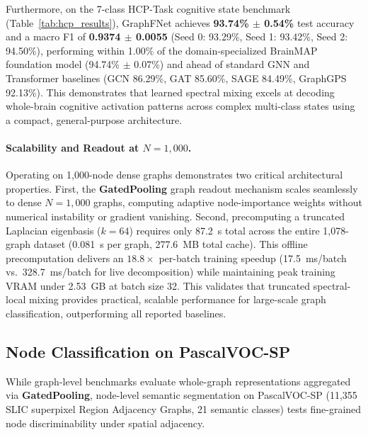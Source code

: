 \documentclass[10pt]{article}
\begin{document}
Furthermore, on the 7-class HCP-Task cognitive state benchmark (Table~\ref{tab:hcp_results}), GraphFNet achieves \textbf{93.74\% $\pm$ 0.54\%} test accuracy and a macro F1 of \textbf{0.9374 $\pm$ 0.0055} (Seed 0: 93.29\%, Seed 1: 93.42\%, Seed 2: 94.50\%), performing within 1.00\% of the domain-specialized BrainMAP foundation model (94.74\% $\pm$ 0.07\%) and ahead of standard GNN and Transformer baselines (GCN 86.29\%, GAT 85.60\%, SAGE 84.49\%, GraphGPS 92.13\%). This demonstrates that learned spectral mixing excels at decoding whole-brain cognitive activation patterns across complex multi-class states using a compact, general-purpose architecture.

\paragraph{Scalability and Readout at $N=1,000$.} Operating on 1,000-node dense graphs demonstrates two critical architectural properties. First, the \textbf{GatedPooling} graph readout mechanism scales seamlessly to dense $N=1,000$ graphs, computing adaptive node-importance weights without numerical instability or gradient vanishing. Second, precomputing a truncated Laplacian eigenbasis ($k=64$) requires only 87.2~s total across the entire 1,078-graph dataset (0.081~s per graph, 277.6~MB total cache). This offline precomputation delivers an $\mathbf{18.8\times}$ per-batch training speedup (17.5~ms/batch vs.\ 328.7~ms/batch for live decomposition) while maintaining peak training VRAM under 2.53~GB at batch size 32. This validates that truncated spectral-local mixing provides practical, scalable performance for large-scale graph classification, outperforming all reported baselines.

\subsection{Node Classification on PascalVOC-SP}
\label{sec:pascalvoc_results}

While graph-level benchmarks evaluate whole-graph representations aggregated via \textbf{GatedPooling}, node-level semantic segmentation on PascalVOC-SP \citep{dwivedi2022long} (11,355 SLIC superpixel Region Adjacency Graphs, 21 semantic classes) tests fine-grained node discriminability under spatial adjacency.
\end{document}

